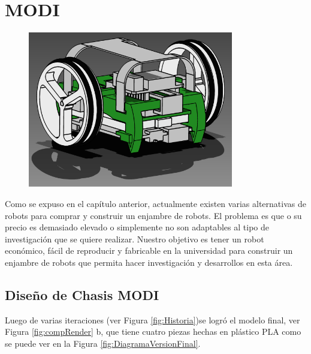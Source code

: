 
\chapter{MODI} %

\label{Chapter5} %


\begin{figure}[htbp]
	\centering
		\includegraphics[width=0.8\textwidth]{./Figures/MODI/render.png}
	\label{fig:MODI}
\end{figure}

Como se expuso en el capítulo anterior, actualmente existen varias alternativas de robots para comprar y construir un enjambre de robots. El problema es que o su precio es demasiado elevado o simplemente no son adaptables al tipo de investigación que se quiere realizar. Nuestro objetivo es tener un robot económico, fácil de reproducir y fabricable en la universidad para construir un enjambre de robots que permita hacer investigación y desarrollos en esta área.



\section{Diseño de Chasis MODI}
Luego de varias iteraciones (ver Figura \ref{fig:Historia})se logró el modelo final, ver Figura \ref{fig:compRender} b, que tiene cuatro piezas hechas en plástico PLA como se puede ver en la Figura \ref{fig:DiagramaVersionFinal}. 

